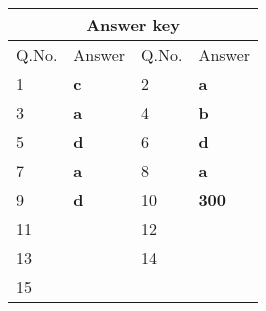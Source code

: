 \begin{table}[H]
	\centering
	\begin{tabular}{|p{1.5cm}|p{1.5cm}||p{1.5cm}|p{1.5cm}|}
		\hline
		\multicolumn{4}{|c|}{\textbf{Answer key}}\\\hline\hline
		\rowcolor{ocrel}Q.No.&Answer&Q.No.&Answer\\\hline
		1&\textbf{c} &2&\textbf{a}\\\hline 
		3&\textbf{a} &4&\textbf{b} \\\hline
		5&\textbf{d} &6&\textbf{d} \\\hline
		7&\textbf{a}&8&\textbf{a}\\\hline
		9&\textbf{d}&10&\textbf{300}\\\hline
		11&\textbf{} &12&\textbf{}\\\hline
		13&\textbf{}&14&\textbf{}\\\hline
		15&\textbf{}& &\\\hline
		
	\end{tabular}
\end{table}
